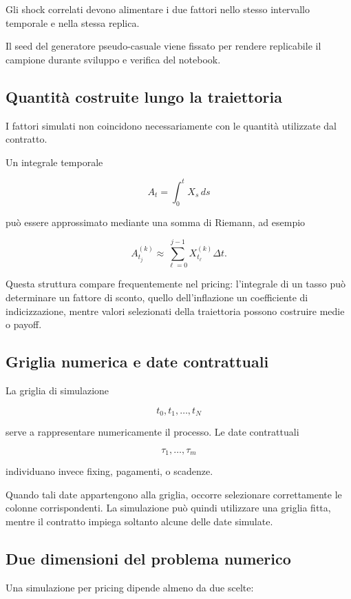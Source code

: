 Gli shock correlati devono alimentare i due fattori nello stesso intervallo
temporale e nella stessa replica.

Il seed del generatore pseudo-casuale viene fissato per rendere replicabile il
campione durante sviluppo e verifica del notebook.

\subsection{Quantit\`a costruite lungo la traiettoria}

I fattori simulati non coincidono necessariamente con le quantit\`a utilizzate
dal contratto.

Un integrale temporale

\[
A_t
=
\int_0^t X_s\,ds
\]

\noindent pu\`o essere approssimato mediante una somma di Riemann, ad esempio

\[
A_{t_j}^{(k)}
\approx
\sum_{\ell=0}^{j-1}
X_{t_\ell}^{(k)}\Delta t.
\]

Questa struttura compare frequentemente nel pricing: l'integrale di un tasso
pu\`o determinare un fattore di sconto, quello dell'inflazione un coefficiente
di indicizzazione, mentre valori selezionati della traiettoria possono
costruire medie o payoff.

\subsection{Griglia numerica e date contrattuali}

La griglia di simulazione

\[
t_0,t_1,\ldots,t_N
\]

\noindent serve a rappresentare numericamente il processo. Le date contrattuali

\[
\tau_1,\ldots,\tau_m
\]

\noindent individuano invece fixing, pagamenti, o scadenze.

Quando tali date appartengono alla griglia, occorre selezionare correttamente
le colonne corrispondenti. La simulazione pu\`o quindi utilizzare una griglia
fitta, mentre il contratto impiega soltanto alcune delle date simulate.

\subsection{Due dimensioni del problema numerico}

Una simulazione per pricing dipende almeno da due scelte:

